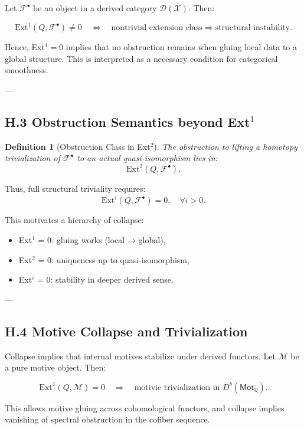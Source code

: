 \documentclass[11pt]{article}
\newtheorem{definition}[theorem]{Definition}
\begin{document}
Let $\mathcal{F}^\bullet$ be an object in a derived category $\mathcal{D}(\mathcal{X})$.  
Then:

\[
\mathrm{Ext}^1(Q, \mathcal{F}^\bullet) \neq 0 \quad \Leftrightarrow \quad 
\text{nontrivial extension class} \Rightarrow \text{structural instability}.
\]

Hence, Ext$^1 = 0$ implies that no obstruction remains when gluing local data to a global structure.  
This is interpreted as a necessary condition for categorical smoothness.

---

\subsection*{H.3 Obstruction Semantics beyond Ext$^1$}

\begin{definition}[Obstruction Class in Ext$^2$]
The obstruction to lifting a homotopy trivialization of $\mathcal{F}^\bullet$ to an actual quasi-isomorphism lies in:
\[
\mathrm{Ext}^2(Q, \mathcal{F}^\bullet).
\]
\end{definition}

Thus, full structural triviality requires:
\[
\mathrm{Ext}^i(Q, \mathcal{F}^\bullet) = 0, \quad \forall i > 0.
\]

This motivates a hierarchy of collapse:

\begin{itemize}
  \item Ext$^1$ = 0: gluing works (local → global),
  \item Ext$^2$ = 0: uniqueness up to quasi-isomorphism,
  \item Ext$^i$ = 0: stability in deeper derived sense.
\end{itemize}

---

\subsection*{H.4 Motive Collapse and Trivialization}

Collapse implies that internal motives stabilize under derived functors.  
Let $\mathcal{M}$ be a pure motive object. Then:

\[
\mathrm{Ext}^1(Q, \mathcal{M}) = 0 \quad \Rightarrow \quad 
\text{motivic trivialization in } D^b(\mathsf{Mot}_\mathbb{Q}).
\]

This allows motive gluing across cohomological functors, and collapse implies vanishing of spectral obstruction in the cofiber sequence.
\end{document}
